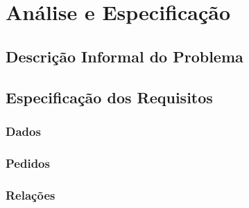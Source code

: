\chapter{Análise e Especificação}
\label{ae}
\section{Descrição Informal do Problema}



\section{Especificação dos Requisitos}

\subsection{Dados}

\subsection{Pedidos}

\subsection{Relações}


